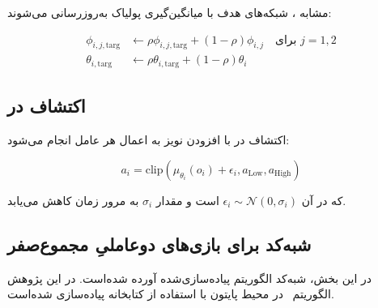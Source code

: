 مشابه ، شبکه‌های هدف با میانگین‌گیری پولیاک به‌روزرسانی می‌شوند:

\begin{align*}
    \phi_{i,j,\text{targ}} &\leftarrow \rho \phi_{i,j,\text{targ}} + (1 - \rho) \phi_{i,j} \quad \text{برای } j=1,2 \\
    \theta_{i,\text{targ}} &\leftarrow \rho \theta_{i,\text{targ}} + (1 - \rho) \theta_i
\end{align*}

\subsection{اکتشاف در }

اکتشاف در  با افزودن نویز به اعمال هر عامل انجام می‌شود:

\begin{equation}
    a_i = \text{clip}(\mu_{\theta_i}(o_i) + \epsilon_i, a_{\text{Low}}, a_{\text{High}})
\end{equation}

که در آن $\epsilon_i \sim \mathcal{N}(0, \sigma_i)$ است و مقدار $\sigma_i$ به مرور زمان کاهش می‌یابد.

\subsection{شبه‌کد  برای بازی‌های دو­عاملیِ مجموع­‌صفر}

در این بخش، شبه‌کد الگوریتم  پیاده‌سازی‌شده آورده شده‌است. در این پژوهش الگوریتم~ در محیط پایتون با استفاده از کتابخانه  \cite{paszke2017automatic} پیاده‌سازی شده‌است.

